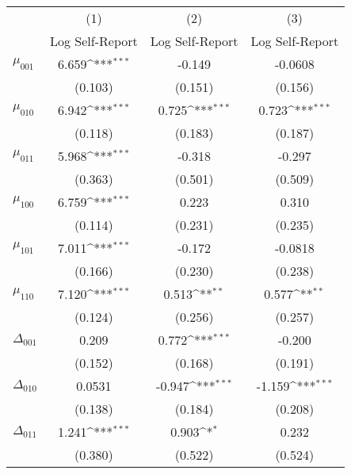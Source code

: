 {
\def\sym#1{\ifmmode^{#1}\else\(^{#1}\)\fi}
\begin{tabular}{l*{3}{c}}
\hline\hline
            &\multicolumn{1}{c}{(1)}&\multicolumn{1}{c}{(2)}&\multicolumn{1}{c}{(3)}\\
            &\multicolumn{1}{c}{Log Self-Report}&\multicolumn{1}{c}{Log Self-Report}&\multicolumn{1}{c}{Log Self-Report}\\
\hline
$\mu_{001}$ &       6.659\sym{***}&      -0.149         &     -0.0608         \\
            &     (0.103)         &     (0.151)         &     (0.156)         \\
[1em]
$\mu_{010}$ &       6.942\sym{***}&       0.725\sym{***}&       0.723\sym{***}\\
            &     (0.118)         &     (0.183)         &     (0.187)         \\
[1em]
$\mu_{011}$ &       5.968\sym{***}&      -0.318         &      -0.297         \\
            &     (0.363)         &     (0.501)         &     (0.509)         \\
[1em]
$\mu_{100}$ &       6.759\sym{***}&       0.223         &       0.310         \\
            &     (0.114)         &     (0.231)         &     (0.235)         \\
[1em]
$\mu_{101}$ &       7.011\sym{***}&      -0.172         &     -0.0818         \\
            &     (0.166)         &     (0.230)         &     (0.238)         \\
[1em]
$\mu_{110}$ &       7.120\sym{***}&       0.513\sym{**} &       0.577\sym{**} \\
            &     (0.124)         &     (0.256)         &     (0.257)         \\
[1em]
$\Delta_{001}$&       0.209         &       0.772\sym{***}&      -0.200         \\
            &     (0.152)         &     (0.168)         &     (0.191)         \\
[1em]
$\Delta_{010}$&      0.0531         &      -0.947\sym{***}&      -1.159\sym{***}\\
            &     (0.138)         &     (0.184)         &     (0.208)         \\
[1em]
$\Delta_{011}$&       1.241\sym{***}&       0.903\sym{*}  &       0.232         \\
            &     (0.380)         &     (0.522)         &     (0.524)         \\

\end{tabular}}
